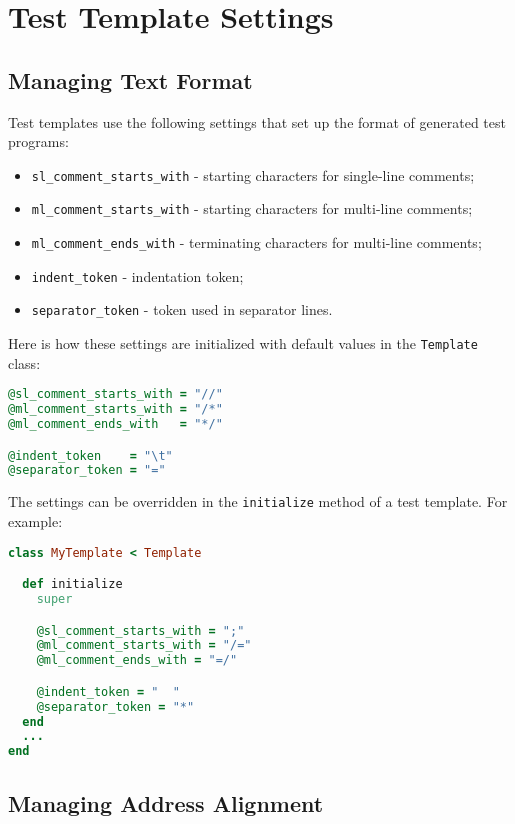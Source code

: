 \documentclass[oneside,final,12pt]{extreport}
\begin{document}
\section{Test Template Settings}

\subsection{Managing Text Format}

Test templates use the following settings that set up the format of generated
test programs:

\begin{itemize}
\item \texttt{sl{\_}comment{\_}starts{\_}with} - starting characters for single-line comments;
\item \texttt{ml{\_}comment{\_}starts{\_}with} - starting characters for multi-line comments;
\item \texttt{ml{\_}comment{\_}ends{\_}with} - terminating characters for multi-line comments;
\item \texttt{indent{\_}token} - indentation token;
\item \texttt{separator{\_}token} - token used in separator lines.
\end{itemize}

Here is how these settings are initialized with default values in
the \texttt{Template} class:

\begin{lstlisting}[language=ruby]
@sl_comment_starts_with = "//"
@ml_comment_starts_with = "/*"
@ml_comment_ends_with   = "*/"

@indent_token    = "\t"
@separator_token = "="
\end{lstlisting}

The settings can be overridden in the \texttt{initialize} method of a test template.
For example:

\begin{lstlisting}[language=ruby]
class MyTemplate < Template

  def initialize
    super

    @sl_comment_starts_with = ";" 
    @ml_comment_starts_with = "/="
    @ml_comment_ends_with = "=/"

    @indent_token = "  "
    @separator_token = "*" 
  end
  ...
end
\end{lstlisting}

\subsection{Managing Address Alignment}
\label{managing_address_alignment}
\end{document}
